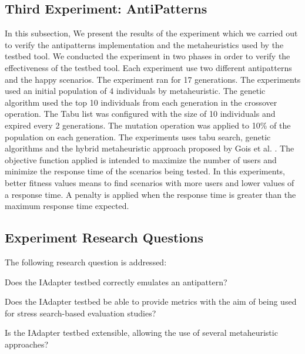 \documentclass{report}
\begin{document}

\subsection{Third Experiment: AntiPatterns}

In this subsection, We present the results of the experiment which we carried out to verify the antipatterns  implementation and the metaheuristics used by the testbed tool. We conducted the experiment in two phases in order to verify the effectiveness of the testbed tool. Each experiment use two different antipatterns and the happy scenarios. The experiment ran for 17 generations. The experiments used an initial population of 4 individuals by metaheuristic. The genetic algorithm used the top 10 individuals from each generation in the crossover operation. The Tabu list was configured with the size of 10 individuals and expired every 2 generations.  The mutation operation was applied to 10\% of the population on each generation. The experiments uses tabu search, genetic algorithms and the hybrid metaheuristic approach proposed by Gois et al. \cite{Gois2016}. The objective function applied is intended to maximize the number of users and minimize the response time of the scenarios being tested.  In this experiments, better fitness values means to find scenarios with more users and lower values of a response time. A penalty is applied when the response time is greater than the  maximum response time expected.

\subsection{Experiment Research Questions}

The following research question is addressed:
\begin{itemize*}
\item Does the IAdapter testbed correctly emulates an antipattern?
\item Does the IAdapter testbed be able to provide metrics with the aim of being used for stress search-based evaluation studies?
\item Is the IAdapter testbed extensible, allowing the use of several metaheuristic approaches?
\end{itemize*}
\end{document}
